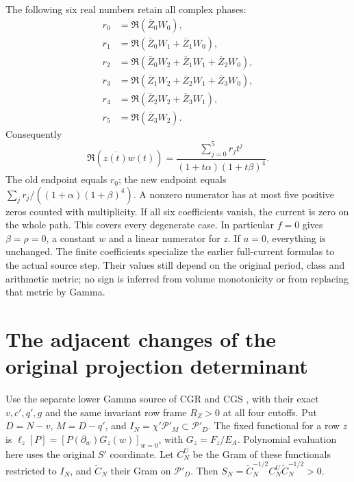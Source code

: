 \documentclass[11pt]{article}
\begin{document}
The following six real numbers retain all complex phases:
\begin{equation}\tag{ACC15}
\begin{aligned}
r_0&=\Re(\overline Z_0W_0),\\
r_1&=\Re(\overline Z_0W_1+\overline Z_1W_0),\\
r_2&=\Re(\overline Z_0W_2+\overline Z_1W_1+\overline Z_2W_0),\\
r_3&=\Re(\overline Z_1W_2+\overline Z_2W_1+\overline Z_3W_0),\\
r_4&=\Re(\overline Z_2W_2+\overline Z_3W_1),\\
r_5&=\Re(\overline Z_3W_2).
\end{aligned}
\end{equation}
Consequently
\begin{equation}\tag{ACC16}
\boxed{\Re(\overline{z(t)}w(t))
=\frac{\sum_{j=0}^5r_jt^j}{(1+t\alpha)(1+t\beta)^4}.}
\end{equation}
The old endpoint equals \(r_0\); the new endpoint equals
\(\sum_jr_j/((1+\alpha)(1+\beta)^4)\).
A nonzero numerator has at most five positive zeros counted with
multiplicity. If all six coefficients vanish, the current is zero
on the whole path. This covers every degenerate case.
In particular \(f=0\) gives \(\beta=\rho=0\), a constant \(w\) and
a linear numerator for \(z\). If \(u=0\), everything is unchanged.
The finite coefficients specialize the earlier full-current formulas
to the actual source step. Their values still depend on the original
period, class and arithmetic metric; no sign is inferred from volume
monotonicity or from replacing that metric by Gamma.

\section{The adjacent changes of the original projection determinant}
Use the separate lower Gamma source of CGR and CGS \cite{ACCCGR,ACCCGS},
with their exact \(v,c',q',g\) and the same invariant row frame
\(R_Z>0\) at all four cutoffs. Put
\(D=N-v\), \(M=D-q'\), and \(I_N=\chi'\mathcal P'_M\subset\mathcal P'_D\).
The fixed functional for a row \(z\) is
\(\ell_z[P]=[P(\partial_w)G_z(w)]_{w=0}\), with \(G_z=F_z/E_A\).
Polynomial evaluation here uses the original \(S'\) coordinate.
Let \(C_N^U\) be the Gram of these functionals restricted to \(I_N\),
and \(\widetilde C_N\) their Gram on \(\mathcal P'_D\).
Then \(S_N=\widetilde C_N^{-1/2}C_N^U\widetilde C_N^{-1/2}>0\).
\end{document}
